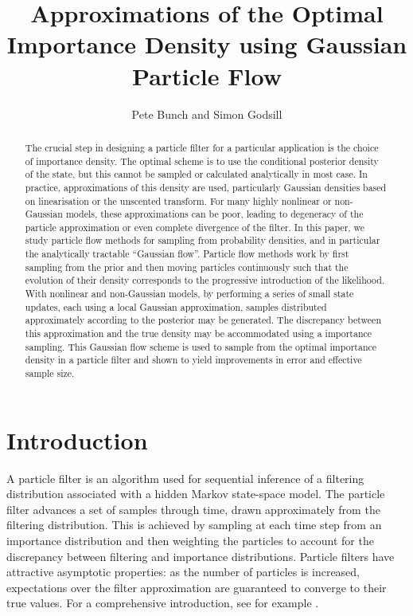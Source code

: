 \documentclass{article}
\title{Approximations of the Optimal Importance Density using Gaussian Particle Flow}
\author{Pete Bunch and Simon Godsill}
\date{}
\begin{document}
\maketitle

\begin{abstract}
The crucial step in designing a particle filter for a particular application is the choice of importance density. The optimal scheme is to use the conditional posterior density of the state, but this cannot be sampled or calculated analytically in most case. In practice, approximations of this density are used, particularly Gaussian densities based on linearisation or the unscented transform. For many highly nonlinear or non-Gaussian models, these approximations can be poor, leading to degeneracy of the particle approximation or even complete divergence of the filter. In this paper, we study particle flow methods for sampling from probability densities, and in particular the analytically tractable ``Gaussian flow''. Particle flow methods work by first sampling from the prior and then moving particles continuously such that the evolution of their density corresponds to the progressive introduction of the likelihood. With nonlinear and non-Gaussian models, by performing a series of small state updates, each using a local Gaussian approximation, samples distributed approximately according to the posterior may be generated. The discrepancy between this approximation and the true density may be accommodated using a importance sampling. This Gaussian flow scheme is used to sample from the optimal importance density in a particle filter and shown to yield improvements in error and effective sample size.
\end{abstract}






\section{Introduction}

A particle filter is an algorithm used for sequential inference of a filtering distribution associated with a hidden Markov state-space model. The particle filter advances a set of samples through time, drawn approximately from the filtering distribution. This is achieved by sampling at each time step from an importance distribution and then weighting the particles to account for the discrepancy between filtering and importance distributions. Particle filters have attractive asymptotic properties: as the number of particles is increased, expectations over the filter approximation are guaranteed to converge to their true values. For a comprehensive introduction, see for example \citep{Cappe2007,Doucet2009}.
\end{document}
